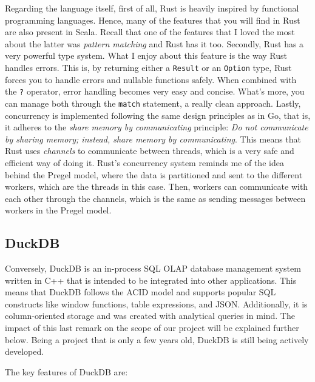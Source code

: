 Regarding the language itself, first of all, Rust is heavily inspired by functional programming languages. Hence, many of the features that you will find in Rust are also present in Scala. Recall that one of the features that I loved the most about the latter was \textit{pattern matching} and Rust has it too. Secondly, Rust has a very powerful type system. What I enjoy about this feature is the way Rust handles errors. This is, by returning either a \texttt{Result} or an \texttt{Option} type, Rust forces you to handle errors and nullable functions safely. When combined with the \texttt{?} operator, error handling becomes very easy and concise. What's more, you can manage both through the \texttt{match} statement, a really clean approach. Lastly, concurrency is implemented following the same design principles as in Go, that is, it adheres to the \textit{share memory by communicating} principle: \textit{Do not communicate by sharing memory; instead, share memory by communicating}. This means that Rust uses \textit{channels} to communicate between threads, which is a very safe and efficient way of doing it. Rust's concurrency system reminds me of the idea behind the Pregel model, where the data is partitioned and sent to the different workers, which are the threads in this case. Then, workers can communicate with each other through the channels, which is the same as sending messages between workers in the Pregel model.

\subsection{DuckDB}

Conversely, DuckDB is an in-process SQL OLAP database management system written in C++ that is intended to be integrated into other applications. This means that DuckDB follows the ACID model and supports popular SQL constructs like window functions, table expressions, and JSON. Additionally, it is column-oriented storage and was created with analytical queries in mind. The impact of this last remark on the scope of our project will be explained further below. Being a project that is only a few years old, DuckDB is still being actively developed.

The key features of DuckDB are:

